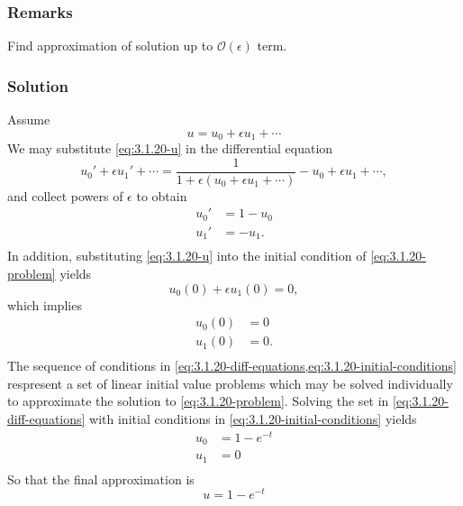 \documentclass[12pt]{article}
\begin{document}
\subsubsection*{Remarks}
Find approximation of solution up to $\mathcal{O}(\epsilon)$ term.

\subsubsection*{Solution}
Assume
\begin{equation}
  \label{eq:3.1.20-u}
  u = u_0 + \epsilon u_1 + \cdots
\end{equation}
We may substitute \cref{eq:3.1.20-u} in the differential equation
\begin{equation*}
  u_0'+\epsilon u_1'+\cdots = \frac{1}{1+\epsilon(u_0+\epsilon u_1+\cdots)}
  - u_0+\epsilon u_1+\cdots,
\end{equation*}
and collect powers of $\epsilon$ to obtain
\begin{equation}
  \begin{aligned}
    \label{eq:3.1.20-diff-equations}
    u_0' &= 1-u_0 \\
    u_1' &= -u_1. \\
  \end{aligned}
\end{equation}
In addition, substituting \cref{eq:3.1.20-u} into the initial condition of
\cref{eq:3.1.20-problem} yields
\begin{equation*}
  u_0(0)+\epsilon u_1(0) = 0,
\end{equation*}
which implies
\begin{equation}
  \label{eq:3.1.20-initial-conditions}
  \begin{aligned}
    u_0(0) &= 0 \\
    u_1(0) &= 0. \\
  \end{aligned}
\end{equation}
The sequence of conditions in
\cref{eq:3.1.20-diff-equations,eq:3.1.20-initial-conditions} respresent a set of
linear initial value problems which may be solved individually to approximate
the solution to \cref{eq:3.1.20-problem}. Solving the set in
\cref{eq:3.1.20-diff-equations} with initial conditions in
\cref{eq:3.1.20-initial-conditions} yields
\begin{equation*}
  \begin{aligned}
    u_0 &= 1-e^{-t} \\
    u_1 &= 0 \\
  \end{aligned}
\end{equation*}
So that the final approximation is
\begin{equation*}
  \boxed{
    u = 1-e^{-t}
  }
\end{equation*}
\end{document}
